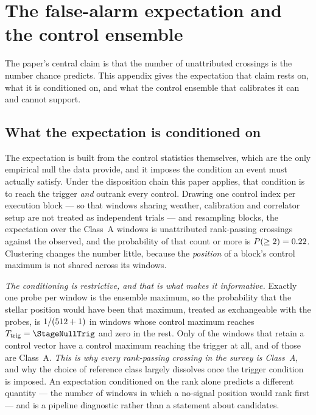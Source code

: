 \section{The false-alarm expectation and the control ensemble}
\label{app:falsealarm}

The paper's central claim is that the number of unattributed crossings is the
number chance predicts. This appendix gives the expectation that claim rests
on, what it is conditioned on, and what the control ensemble that calibrates
it can and cannot support.

\subsection{What the expectation is conditioned on}

The expectation is built from the control statistics themselves, which are
the only empirical null the data provide, and it imposes the condition an
event must actually satisfy. Under the disposition chain this paper applies,
that condition is to reach the trigger \emph{and} outrank every control.
Drawing one control index per execution block --- so that windows sharing
weather, calibration and correlator setup are not treated as independent
trials --- and resampling blocks, the expectation over the \NWinA{} Class~A
windows is \ClustStageMean{} unattributed rank-passing crossings against the
\ClustStageNObs{} observed, and the probability of that count or more is
$P(\geq2)=0.22$. Clustering changes the number
little, because the \emph{position} of a block's control maximum is not
shared across its windows.

\emph{The conditioning is restrictive, and that is what makes it
informative.} Exactly one probe per window is the ensemble maximum, so the
probability that the stellar position would have been that maximum, treated
as exchangeable with the probes, is $1/(512+1)$ in windows whose control
maximum reaches $T_{\rm trig}=\StageNullTrig$ and zero in the rest. Only
\StageNullEligible{} of the \StageNullAllWin{} windows that retain a control
vector have a control maximum reaching the trigger at all, and
\StageNullEligibleA{} of those are Class~A. \emph{This is why every
rank-passing crossing in the survey is Class~A}, and why the choice of
reference class largely dissolves once the trigger condition is imposed. An
expectation conditioned on the rank alone predicts a different quantity ---
the number of windows in which a no-signal position would rank first --- and
is a pipeline diagnostic rather than a statement about candidates.

